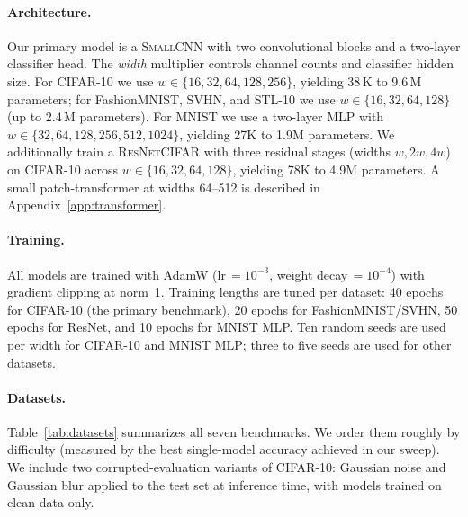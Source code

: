 \documentclass[11pt]{article}
\begin{document}
\paragraph{Architecture.}
Our primary model is a \textsc{SmallCNN} with two convolutional blocks and
a two-layer classifier head.  The \emph{width} multiplier controls channel
counts and classifier hidden size.  For CIFAR-10 we use $w \in \{16,32,64,128,256\}$,
yielding 38\,K to 9.6\,M parameters; for FashionMNIST, SVHN, and STL-10 we use
$w \in \{16,32,64,128\}$ (up to 2.4\,M parameters).  For MNIST we use a
two-layer MLP with $w \in \{32,64,128,256,512,1024\}$, yielding 27K to 1.9M
parameters.  We additionally train a \textsc{ResNetCIFAR} with three residual
stages (widths $w, 2w, 4w$) on CIFAR-10 across $w \in \{16,32,64,128\}$,
yielding 78K to 4.9M parameters.  A small patch-transformer at widths 64--512
is described in Appendix~\ref{app:transformer}.

\paragraph{Training.}
All models are trained with AdamW (lr$\,{=}10^{-3}$, weight
decay$\,{=}10^{-4}$) with gradient clipping at norm~1.  Training lengths
are tuned per dataset: 40 epochs for CIFAR-10 (the primary benchmark),
20 epochs for FashionMNIST/SVHN, 50 epochs for ResNet, and 10 epochs
for MNIST MLP.  Ten random seeds are used per width for CIFAR-10 and
MNIST MLP; three to five seeds are used for other datasets.

\paragraph{Datasets.}
Table~\ref{tab:datasets} summarizes all seven benchmarks.  We order them
roughly by difficulty (measured by the best single-model accuracy achieved
in our sweep).  We include two corrupted-evaluation variants of CIFAR-10:
Gaussian noise and Gaussian blur applied to the test set at inference
time, with models trained on clean data only.
\end{document}
